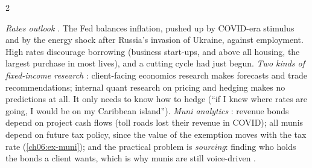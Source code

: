 \begin{paracol}{2}
\begin{finance}
\emph{Rates outlook} . The Fed balances inflation, pushed up by COVID-era stimulus and by the
energy shock after Russia's invasion of Ukraine, against employment. High rates discourage borrowing (business
start-ups, and above all housing, the largest purchase in most lives), and a cutting cycle had just begun.
\emph{Two kinds of fixed-income research} : client-facing economics research makes forecasts
and trade recommendations; internal quant research on pricing and hedging makes no predictions at all. It only
needs to know how to hedge (``if I knew where rates are going, I would be on my Caribbean island'').
\emph{Muni analytics} : revenue bonds depend on project cash flows (toll roads lost their revenue
in COVID); all munis depend on future tax policy, since the value of the exemption moves with the tax rate
(\cref{ch06:ex-muni}); and the practical problem is \emph{sourcing}: finding who holds the bonds a client wants,
which is why munis are still voice-driven .
\end{finance}


\end{paracol}
